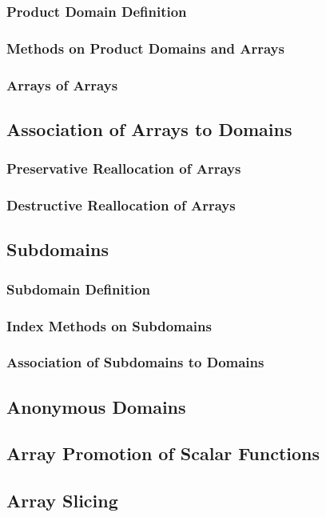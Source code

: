 \documentclass[10pt,twoside,titlepage]{article}
\begin{document}
\subsubsection{Product Domain Definition}
\subsubsection{Methods on Product Domains and Arrays}
\subsubsection{Arrays of Arrays}
\subsection{Association of Arrays to Domains}
\subsubsection{Preservative Reallocation of Arrays}
\subsubsection{Destructive Reallocation of Arrays}
\subsection{Subdomains}
\subsubsection{Subdomain Definition}
\subsubsection{Index Methods on Subdomains}
\subsubsection{Association of Subdomains to Domains}
\subsection{Anonymous Domains}
\subsection{Array Promotion of Scalar Functions}
\subsection{Array Slicing}
\end{document}
